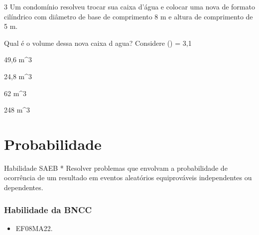 

\num{3} Um condomínio resolveu trocar sua caixa d'água e colocar uma nova de
formato cilíndrico com diâmetro de base de comprimento 8 m e altura de
comprimento de 5 m.

Qual é o volume dessa nova caixa d agua? Considere () = 3,1
\item 49,6 m^3
\item 24,8 m^3
\item 62 m^3
\item 248 m^3











\chapter{Probabilidade}

Habilidade SAEB * Resolver problemas que envolvam a probabilidade de
ocorrência de um resultado em eventos aleatórios equiprováveis
independentes ou dependentes.

\subsection{Habilidade da BNCC}

\begin{itemize}
  \item EF08MA22.
\end{itemize}

